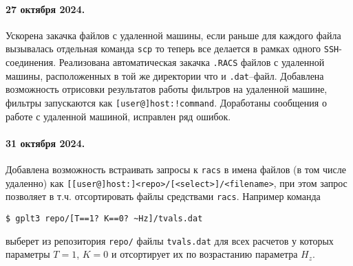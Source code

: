 \documentclass[12pt]{article}
\begin{document}
\paragraph{27 октября 2024.} Ускорена закачка файлов с удаленной машины, если раньше для каждого файла вызывалась отдельная команда \verb'scp'
то теперь все делается в рамках одного \verb'SSH'-соединения. Реализована автоматическая закачка \verb'.RACS' файлов с удаленной машины, расположенных
в той же директории что и \verb'.dat'--файл.  Добавлена возможность отрисовки результатов работы фильтров на удаленной машине,
фильтры запускаются как \verb'[user@]host:!command'. Доработаны сообщения о работе с удаленной машиной, исправлен ряд ошибок.

\paragraph{31 октября 2024.} Добавлена возможность встраивать запросы к \verb'racs'  в имена файлов (в том числе удаленно) как 
   \verb'[[user@]host:]<repo>/[<select>]/<filename>', при этом запрос позволяет в т.ч. отсортировать файлы средствами \verb'racs'.
Например команда
\begin{verbatim}
$ gplt3 repo/[T==1? K==0? ~Hz]/tvals.dat
\end{verbatim}
выберет из репозитория \verb'repo/' файлы \verb'tvals.dat' для всех расчетов у которых параметры $T=1$, $K=0$ и отсортирует их по возрастанию параметра $H_z$.
\end{document}
